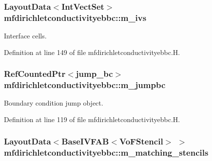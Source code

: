 \subsubsection[{\texorpdfstring{m\+\_\+ivs}{m_ivs}}]{\setlength{\rightskip}{0pt plus 5cm}Layout\+Data$<$Int\+Vect\+Set$>$ mfdirichletconductivityebbc\+::m\+\_\+ivs\hspace{0.3cm}{\ttfamily [protected]}}\hypertarget{classmfdirichletconductivityebbc_aa3ccf3355cf102fb3a211b673d913c43}{}\label{classmfdirichletconductivityebbc_aa3ccf3355cf102fb3a211b673d913c43}


Interface cells. 



Definition at line 149 of file mfdirichletconductivityebbc.\+H.

\subsubsection[{\texorpdfstring{m\+\_\+jumpbc}{m_jumpbc}}]{\setlength{\rightskip}{0pt plus 5cm}Ref\+Counted\+Ptr$<${\bf jump\+\_\+bc}$>$ mfdirichletconductivityebbc\+::m\+\_\+jumpbc\hspace{0.3cm}{\ttfamily [protected]}}\hypertarget{classmfdirichletconductivityebbc_ad0df46438cb38a6db0abb666854a256c}{}\label{classmfdirichletconductivityebbc_ad0df46438cb38a6db0abb666854a256c}


Boundary condition jump object. 



Definition at line 119 of file mfdirichletconductivityebbc.\+H.

\subsubsection[{\texorpdfstring{m\+\_\+matching\+\_\+stencils}{m_matching_stencils}}]{\setlength{\rightskip}{0pt plus 5cm}Layout\+Data$<$Base\+I\+V\+F\+AB$<$Vo\+F\+Stencil$>$ $>$ mfdirichletconductivityebbc\+::m\+\_\+matching\+\_\+stencils\hspace{0.3cm}{\ttfamily [protected]}}\hypertarget{classmfdirichletconductivityebbc_af828523744be351bc8c65e52fd8515d3}{}\label{classmfdirichletconductivityebbc_af828523744be351bc8c65e52fd8515d3}


